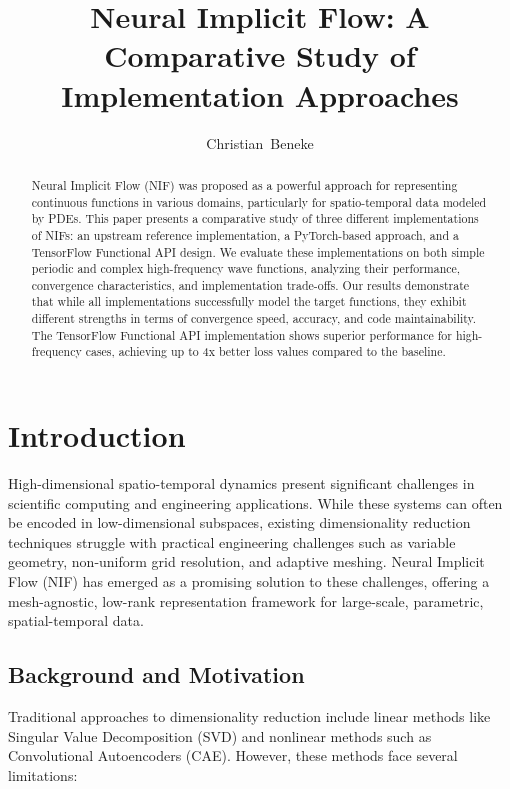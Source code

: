 \documentclass[10pt,journal,compsoc]{IEEEtran}
\begin{document}
\title{Neural Implicit Flow: A Comparative Study of Implementation Approaches}

\author{Christian~Beneke}

\maketitle

\begin{abstract}
Neural Implicit Flow (NIF) was proposed as a powerful approach for representing continuous functions in various domains, particularly for spatio-temporal data modeled by PDEs. This paper presents a comparative study of three different implementations of NIFs: an upstream reference implementation, a PyTorch-based approach, and a TensorFlow Functional API design. We evaluate these implementations on both simple periodic and complex high-frequency wave functions, analyzing their performance, convergence characteristics, and implementation trade-offs. Our results demonstrate that while all implementations successfully model the target functions, they exhibit different strengths in terms of convergence speed, accuracy, and code maintainability. The TensorFlow Functional API implementation shows superior performance for high-frequency cases, achieving up to 4x better loss values compared to the baseline.
\end{abstract}

\section{Introduction}
High-dimensional spatio-temporal dynamics present significant challenges in scientific computing and engineering applications. While these systems can often be encoded in low-dimensional subspaces, existing dimensionality reduction techniques struggle with practical engineering challenges such as variable geometry, non-uniform grid resolution, and adaptive meshing. Neural Implicit Flow (NIF) has emerged as a promising solution to these challenges, offering a mesh-agnostic, low-rank representation framework for large-scale, parametric, spatial-temporal data.

\subsection{Background and Motivation}
Traditional approaches to dimensionality reduction include linear methods like Singular Value Decomposition (SVD) and nonlinear methods such as Convolutional Autoencoders (CAE). However, these methods face several limitations:
\end{document}
